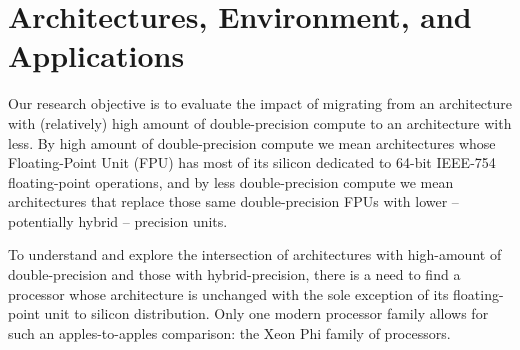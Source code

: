 \section{Architectures, Environment, and Applications}\label{sec:materials}

Our research objective is to evaluate the impact of migrating from an architecture with (relatively) high amount of double-precision compute to an architecture with less. By high amount of double-precision compute we mean architectures whose Floating-Point Unit (FPU) has most of its silicon dedicated to 64-bit IEEE-754 floating-point operations, and by less double-precision compute we mean architectures that replace those same double-precision FPUs with lower -- potentially hybrid -- precision units.


To understand and explore the intersection of architectures with high-amount of double-precision and those with hybrid-precision, there is a need to find a processor whose architecture is unchanged with the sole exception of its floating-point unit to silicon distribution. Only one modern processor family allows for such an apples-to-apples comparison: the Xeon Phi family of processors.

